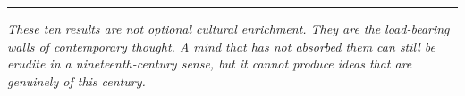 \documentclass[11pt,a4paper]{article}
\begin{document}
	\vspace{1.5em}
	
	\begin{center}
		\color{accent}\rule{0.25\textwidth}{0.6pt}
	\end{center}
	
	\vspace{0.5em}
	
	\noindent\textcolor{steel}{\small\itshape
		These ten results are not optional cultural enrichment. They are the
		load-bearing walls of contemporary thought. A mind that has not
		absorbed them can still be erudite in a nineteenth-century sense, but
		it cannot produce ideas that are genuinely \emph{of this century}.}
\end{document}
